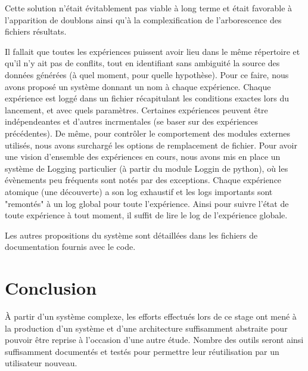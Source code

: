 \documentclass{article}
\begin{document}
Cette solution n'était évitablement pas viable à long terme et était favorable à l'apparition de doublons ainsi qu'à la complexification de l'arborescence des fichiers résultats.

Il fallait que toutes les expériences puissent avoir lieu dans le même répertoire et qu'il n'y ait pas de conflits, tout en identifiant sans ambiguité la source des données générées (à quel moment, pour quelle hypothèse).
Pour ce faire, nous avons proposé un système donnant un nom à chaque expérience.
Chaque expérience est loggé dans un fichier récapitulant les conditions exactes lors du lancement, et avec quels paramètres. Certaines expériences peuvent être indépendeantes et d'autres incrmentales (se baser sur des expériences précédentes). De même, pour contrôler le comportement des modules externes utilisés, nous avons surchargé les options de remplacement de fichier. Pour avoir une vision d'ensemble des expériences en cours, nous avons mis en place un système de Logging particulier (à partir du module Loggin de python), où les évènements peu fréquents sont notés par des exceptions. Chaque expérience atomique (une découverte) a son log exhaustif et les logs importants sont "remontés" à un log global pour toute l'expérience. Ainsi pour suivre l'état de toute expérience à tout moment, il suffit de lire le log de l'expérience globale.


Les autres propositions du système sont détaillées dans les fichiers de documentation fournis avec le code.





\section{Conclusion}

À partir d'un système complexe, les efforts effectués lors de ce stage ont mené à la production d'un système et d'une architecture suffisamment abstraite pour pouvoir être reprise à l'occasion d'une autre étude. Nombre des outils seront ainsi suffisamment documentés et testés pour permettre leur réutilisation par un utilisateur nouveau.






\end{document}
